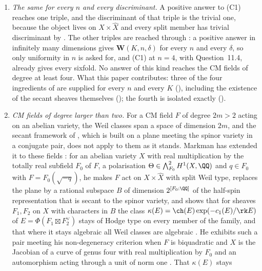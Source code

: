 \begin{enumerate}[label=\textup{(C\arabic*)},leftmargin=3.0em,itemsep=4pt]
  semi-homogeneous bundles (, ), and
  no complete intersection occurs ().
\item \emph{The same for every $n$ and every discriminant.} A positive answer
  to (C1) reaches one triple, and the discriminant of that triple is the
  trivial one, because the object lives on $X\times\widehat X$ and every split
  member has trivial discriminant by \cite[Proposition~15.19(ii)]{paperI}. The other
  triples are reached through : a positive answer in
  infinitely many dimensions gives $\mathbf{W}(K,n,\delta)$ for every $n$ and
  every $\delta$, so only uniformity in $n$ is asked for, and (C1) at $n=4$,
  with Question~11.4, already gives every sixfold. No answer of this kind
  reaches the CM fields of degree at least four. What this paper
  contributes: three of the four ingredients of \cite[Question~13.7]{paperI} are supplied
  for every $n$ and every $K$ (\cite[Theorem~14.15]{paperI}), including the
  existence of the secant sheaves themselves (\cite[Theorem~14.13]{paperI}); the
  fourth is isolated exactly (\cite[Remark~14.16]{paperI}).
\item \emph{CM fields of degree larger than two.} For a CM field $F$ of
  degree $2m>2$ acting on an abelian variety, the Weil classes span a space of
  dimension $2m$, and the secant framework of \cite[Section~14]{paperI}, which
  is built on a plane meeting the spinor variety in a conjugate pair, does not
  apply to them as it stands. Markman has extended it to these fields
  \cite{Mar25c}: for an abelian variety $X$ with real multiplication by the
  totally real subfield $F_{0}$ of $F$, a polarisation
  $\Theta\in\bigwedge^{2}_{F_{0}}H^{1}(X,\QQ)$ and $q\in F_{0}$ with
  $F=F_{0}(\sqrt{-q})$, he makes $F$ act on $X\times\widehat{X}$ with split
  Weil type, replaces the plane by a rational subspace $B$ of dimension
  $2^{[F_{0}:\QQ]}$ of the half-spin representation that is secant to the
  spinor variety, and shows that for sheaves $F_{1},F_{2}$ on $X$ with
  characters in $B$ the class $\kappa(E)=\ch(E)\exp(-c_{1}(E)/\rk E)$ of
  $E=\Phi(F_{1}\boxtimes F_{2}^{\vee})$ stays of Hodge type on every member
  of the family, and that where it stays algebraic all Weil classes are
  algebraic \cite[Theorem~1.1.2, Proposition~10.2.1]{Mar25c}. He exhibits
  such a pair meeting his non-degeneracy criterion when $F$ is biquadratic
  and $X$ is the Jacobian of a curve of genus four with real multiplication
  by $F_{0}$ and an automorphism acting through a unit of norm one
  \cite[Example~11.2.7, Lemma~11.2.8]{Mar25c}. That $\kappa(E)$ stays

\end{enumerate}
